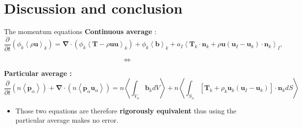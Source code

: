 \documentclass{sintefbeamer}
\newcommand{\kavg}[1]{\left<#1\right>_k}
\newcommand{\Iavg}[1]{\left<#1\right>_I}
\newcommand{\pavg}[1]{n \left<#1\right>}
\newcommand{\nablab}{\bm{\nabla}}
\newcommand{\pddt}{\frac{\partial}{\partial t}}
\begin{document}
\section{Discussion and conclusion}
\begin{frame}
  {The momentum equations}
  \textbf{Continuous average} :
  \begin{equation*}
      \pddt (\phi_k\kavg{\rho \textbf{u}})
      = \nablab \cdot \left(
          \phi_k \kavg{\textbf{T} - \rho \textbf{u} \textbf{u}}
      \right)
      + \phi_k \kavg{\textbf{b}}
      + a_I \Iavg{
          \textbf{T}_k \cdot \textbf{n}_k
          + \rho \textbf{u}
          \left(
              \textbf{u}_I
              - \textbf{u}_k
          \right) \cdot \textbf{n}_k
      },
  \end{equation*}

  \begin{center}
    \begin{equation*}
      \Longleftrightarrow 
    \end{equation*}
  \end{center}
  \textbf{Particular average :}
  \begin{equation*}
    \pddt   \left(\pavg{\textbf{p}_\alpha}\right)
    + \nablab \cdot \left(\pavg{\textbf{p}_\alpha \textbf{u}_\alpha}\right) 
    = \pavg{\int_{V_\alpha} \textbf{b}_k dV}
    + \pavg{\int_{S_\alpha} \left[
      \textbf{T}_k + \rho_k \textbf{u}_k (\textbf{u}_I-\textbf{u}_k) 
      \right] \cdot \textbf{n}_k d S}
\end{equation*}
\begin{itemize}
  \item Those two equations are therefore \textbf{rigorously equivalent} thus using the particular average makes no error. 
\end{itemize}
\end{frame}
\end{document}
